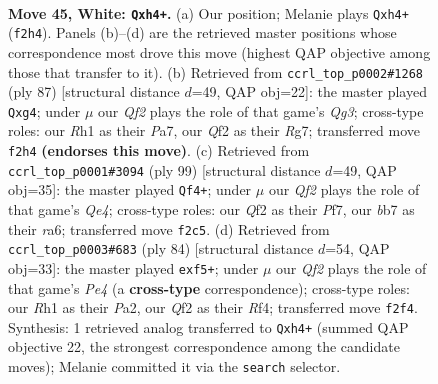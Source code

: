 \documentclass[11pt]{article}
\begin{document}
\clearpage

\begin{figure}[p]\centering
\begin{subfigure}{0.46\textwidth}\centering
\resizebox{\linewidth}{!}{%
\newchessgame
\chessboard[
  setfen={5r2/1b5k/8/8/2B4p/7P/1p3QP1/6KR w - - 5 45},
  showmover=false,
  pgfstyle=straightmove, color=movearrow, markmove={f2-h4}
]}
\caption{}
\end{subfigure}\hfill
\begin{subfigure}{0.46\textwidth}\centering
\resizebox{\linewidth}{!}{%
\newchessgame
\chessboard[
  setfen={6k1/p4pr1/6q1/8/3Q2P1/P7/7K/4R3 b - - 0 44},
  showmover=false,
  pgfstyle=straightmove, color=movearrow, markmove={g6-g4}
]}
\caption{}
\end{subfigure}
\\[4pt]
\begin{subfigure}{0.46\textwidth}\centering
\resizebox{\linewidth}{!}{%
\newchessgame
\chessboard[
  setfen={8/3R1pk1/R3P1p1/1p2q3/8/8/5K2/8 b - - 7 50},
  showmover=false,
  pgfstyle=straightmove, color=movearrow, markmove={e5-f4}
]}
\caption{}
\end{subfigure}\hfill
\begin{subfigure}{0.46\textwidth}\centering
\resizebox{\linewidth}{!}{%
\newchessgame
\chessboard[
  setfen={4r3/pp6/6k1/3P1p2/4PR2/5Kp1/P7/8 w - - 0 43},
  showmover=false,
  pgfstyle=straightmove, color=movearrow, markmove={e4-f5}
]}
\caption{}
\end{subfigure}
\caption{\textbf{Move 45, White: \texttt{Qxh4+}.} (a) Our position; Melanie plays \texttt{Qxh4+} (\texttt{f2h4}). Panels (b)--(d) are the retrieved master positions whose correspondence most drove this move (highest QAP objective among those that transfer to it). (b) Retrieved from \texttt{ccrl\_top\_p0002\#1268} (ply 87) [structural distance $d$=49, QAP obj=22]: the master played \texttt{Qxg4}; under $\mu$ our \emph{Qf2} plays the role of that game's \emph{Qg3}; cross-type roles: our \emph{R}h1 as their \emph{P}a7, our \emph{Q}f2 as their \emph{R}g7; transferred move \texttt{f2h4} \textbf{(endorses this move)}. (c) Retrieved from \texttt{ccrl\_top\_p0001\#3094} (ply 99) [structural distance $d$=49, QAP obj=35]: the master played \texttt{Qf4+}; under $\mu$ our \emph{Qf2} plays the role of that game's \emph{Qe4}; cross-type roles: our \emph{Q}f2 as their \emph{P}f7, our \emph{b}b7 as their \emph{r}a6; transferred move \texttt{f2c5}. (d) Retrieved from \texttt{ccrl\_top\_p0003\#683} (ply 84) [structural distance $d$=54, QAP obj=33]: the master played \texttt{exf5+}; under $\mu$ our \emph{Qf2} plays the role of that game's \emph{Pe4} (a \textbf{cross-type} correspondence); cross-type roles: our \emph{R}h1 as their \emph{P}a2, our \emph{Q}f2 as their \emph{R}f4; transferred move \texttt{f2f4}. Synthesis: 1 retrieved analog transferred to \texttt{Qxh4+} (summed QAP objective 22, the strongest correspondence among the candidate moves); Melanie committed it via the \texttt{search} selector.}
\label{fig:thought-m88}
\end{figure}
\end{document}
